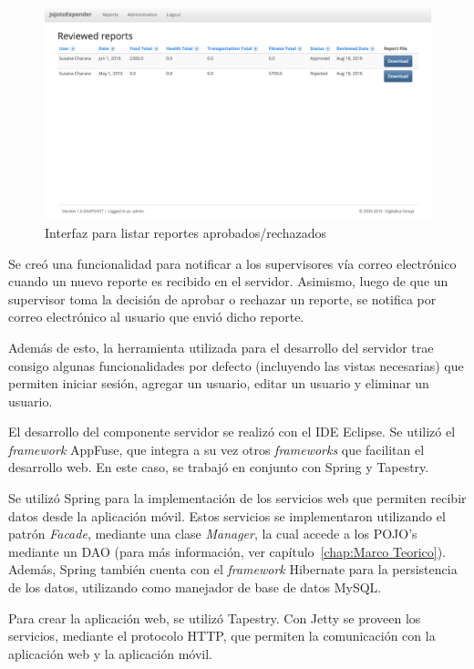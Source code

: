\begin{figure}[h]
  \centering
  \includegraphics[scale=0.38,type=png,ext=.png,read=.png]{imagenes/reviewed_reports}
  \captionsetup{justification=centering}
  \caption{Interfaz para listar reportes aprobados/rechazados}
  \label{fig:interfazListarReportesRevisados}
\end{figure}


Se creó una funcionalidad para notificar a los supervisores vía correo electrónico cuando un nuevo reporte es recibido en el servidor. Asimismo, luego de que un supervisor toma la decisión de aprobar o rechazar un reporte, se notifica por correo electrónico al usuario que envió dicho reporte.

Además de esto, la herramienta utilizada para el desarrollo del servidor trae consigo algunas funcionalidades por defecto (incluyendo las vistas necesarias) que permiten iniciar sesión, agregar un usuario, editar un usuario y eliminar un usuario. 

El desarrollo del componente servidor se realizó con el IDE Eclipse. Se utilizó el \textit{framework} AppFuse, que integra a su vez otros \textit{frameworks} que facilitan el desarrollo web. En este caso, se trabajó en conjunto con Spring y Tapestry.

Se utilizó Spring para la implementación de los servicios web que permiten recibir datos desde la aplicación móvil. Estos servicios se implementaron utilizando el patrón \textit{Facade}, mediante una clase \textit{Manager}, la cual accede a los POJO's mediante un DAO (para más información, ver capítulo~\ref{chap:Marco Teorico}). Además, Spring también cuenta con el \textit{framework} Hibernate para la persistencia de los datos, utilizando como manejador de base de datos MySQL.

Para crear la aplicación web, se utilizó Tapestry. Con Jetty se proveen los servicios, mediante el protocolo HTTP, que permiten la comunicación con la aplicación web y la aplicación  móvil.

